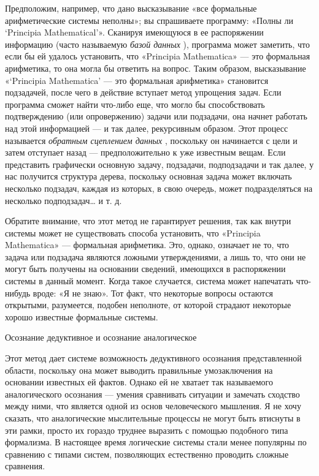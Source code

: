 \documentclass[../main.tex]{subfiles}
\begin{document}
Предположим, например, что дано высказывание «все формальные арифметические системы неполны»; вы спрашиваете программу: «Полны ли \enquote*{Principia Mathematical}». Сканируя имеющуюся в ее распоряжении информацию (часто называемую \emph{базой данных} ), программа может заметить, что если бы ей удалось установить, что «Principia Mathematica» --- это формальная арифметика, то она могла бы ответить на вопрос. Таким образом, высказывание «\enquote*{Principia Mathematica} --- это формальная арифметика» становится подзадачей, после чего в действие вступает метод упрощения задач. Если программа сможет найти что-либо еще, что могло бы способствовать подтверждению (или опровержению) задачи или подзадачи, она начнет работать над этой информацией --- и так далее, рекурсивным образом. Этот процесс называется \emph{обратным сцеплением данных} , поскольку он начинается с цели и затем отступает назад --- предположительно к уже известным вещам. Если представить графически основную задачу, подзадачи, подподзадачи и так далее, у нас получится структура дерева, поскольку основная задача может включать несколько подзадач, каждая из которых, в свою очередь, может подразделяться на несколько подподзадач\ldots{} и т. д.

Обратите внимание, что этот метод не гарантирует решения, так как внутри системы может не существовать способа установить, что «Principia Mathematica» --- формальная арифметика. Это, однако, означает не то, что задача или подзадача являются ложными утверждениями, а лишь то, что они не могут быть получены на основании сведений, имеющихся в распоряжении системы в данный момент. Когда такое случается, система может напечатать что-нибудь вроде: «Я не знаю». Тот факт, что некоторые вопросы остаются открытыми, разумеется, подобен неполноте, от которой страдают некоторые хорошо известные формальные системы.

Осознание дедуктивное и осознание аналогическое

Этот метод дает системе возможность дедуктивного осознания представленной области, поскольку она может выводить правильные умозаключения на основании известных ей фактов. Однако ей не хватает так называемого аналогического осознания --- умения сравнивать ситуации и замечать сходство между ними, что является одной из основ человеческого мышления. Я не хочу сказать, что аналогические мыслительные процессы не могут быть втиснуты в эти рамки, просто их гораздо труднее выразить с помощью подобного типа формализма. В настоящее время логические системы стали менее популярны по сравнению с типами систем, позволяющих естественно проводить сложные сравнения.
\end{document}
